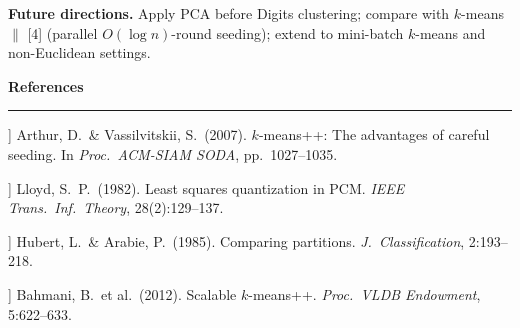 \documentclass[11pt,a4paper]{article}
\begin{document}
\textbf{Future directions.}
Apply PCA before Digits clustering; compare with $k$-means$\|$ [4]
(parallel $O(\log n)$-round seeding); extend to mini-batch $k$-means and non-Euclidean
settings.


\enlargethispage{4\baselineskip}
\vspace{3pt}
{\large\bfseries References}\\[-4pt]
\rule{\linewidth}{0.4pt}\vspace{0pt}
{\footnotesize
\begin{description}[leftmargin=1.8em, labelindent=0pt, itemsep=1pt, parsep=0pt, topsep=0pt]
  \item[[1]] Arthur, D.\ \& Vassilvitskii, S.\ (2007). $k$-means++: The advantages of careful seeding. In \textit{Proc.\ ACM-SIAM SODA}, pp.\ 1027--1035.
  \item[[2]] Lloyd, S.\ P.\ (1982). Least squares quantization in PCM. \textit{IEEE Trans.\ Inf.\ Theory}, 28(2):129--137.
  \item[[3]] Hubert, L.\ \& Arabie, P.\ (1985). Comparing partitions. \textit{J.\ Classification}, 2:193--218.
  \item[[4]] Bahmani, B.\ et al.\ (2012). Scalable $k$-means++. \textit{Proc.\ VLDB Endowment}, 5:622--633.
\end{description}}
\end{document}
